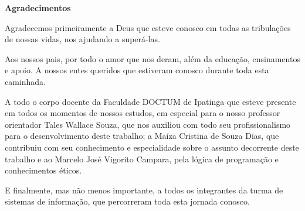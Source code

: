 \begin{center}
\textbf{Agradecimentos}
\end{center}

Agradecemos primeiramente a Deus que esteve conosco em todas as tribulações de nossas vidas, nos ajudando a superá-las.

\vspace{1em}

Aos nossos pais, por todo o amor que nos deram, além da educação, ensinamentos e apoio. A nossos entes queridos que estiveram conosco durante toda esta caminhada.

\vspace{1em}

A todo o corpo docente da Faculdade DOCTUM de Ipatinga que esteve presente em todos os momentos de nossos estudos, em especial para o nosso professor orientador Tales Wallace Souza, que nos auxiliou com todo seu profissionalismo para o desenvolvimento deste trabalho; a Maíza Cristina de Souza Dias, que contribuiu com seu conhecimento e especialidade sobre o assunto decorrente deste trabalho e ao Marcelo José Vigorito Campara, pela lógica de programação e conhecimentos éticos.

\vspace{1em}

E finalmente, mas não menos importante, a todos os integrantes da turma de sistemas de informação, que percorreram toda esta jornada conosco.
